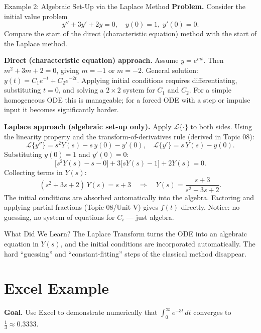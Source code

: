 \documentclass[12pt,a4paper]{article}
\begin{document}
\begin{infobox}{Example 2: Algebraic Set-Up via the Laplace Method}
\textbf{Problem.} Consider the initial value problem
\[
  y'' + 3y' + 2y = 0, \quad y(0) = 1,\; y'(0) = 0.
\]
Compare the start of the direct (characteristic equation) method with the
start of the Laplace method.

\medskip
\textbf{Direct (characteristic equation) approach.}
Assume $y = e^{mt}$.  Then $m^2 + 3m + 2 = 0$, giving $m = -1$ or $m = -2$.
General solution: $y(t) = C_1 e^{-t} + C_2 e^{-2t}$.  Applying initial
conditions requires differentiating, substituting $t=0$, and solving a
$2 \times 2$ system for $C_1$ and $C_2$.  For a simple homogeneous ODE this
is manageable; for a forced ODE with a step or impulse input it becomes
significantly harder.

\medskip
\textbf{Laplace approach (algebraic set-up only).}
Apply $\mathcal{L}\{\cdot\}$ to both sides.  Using the linearity property and
the transform-of-derivatives rule (derived in Topic 08):
\[
  \mathcal{L}\{y''\} = s^2 Y(s) - s\,y(0) - y'(0), \quad
  \mathcal{L}\{y'\}  = s\,Y(s) - y(0).
\]
Substituting $y(0) = 1$ and $y'(0) = 0$:
\[
  \bigl[s^2 Y(s) - s - 0\bigr] + 3\bigl[s Y(s) - 1\bigr] + 2 Y(s) = 0.
\]
Collecting terms in $Y(s)$:
\[
  (s^2 + 3s + 2)\,Y(s) = s + 3
  \quad \Longrightarrow \quad
  Y(s) = \frac{s + 3}{s^2 + 3s + 2}.
\]
The initial conditions are absorbed automatically into the algebra.
Factoring and applying partial fractions (Topic 08/Unit V) gives $f(t)$
directly.  Notice: no guessing, no system of equations for $C_i$ --- just
algebra.
\end{infobox}
\begin{learnbox}{What Did We Learn?}
The Laplace Transform turns the ODE into an algebraic equation in $Y(s)$,
and the initial conditions are incorporated automatically.  The hard
``guessing'' and ``constant-fitting'' steps of the classical method disappear.
\end{learnbox}

\section{Excel Example }

\textbf{Goal.} Use Excel to demonstrate numerically that
$\int_0^\infty e^{-3t}\,dt$ converges to $\frac{1}{3} \approx 0.3333$.
\end{document}
